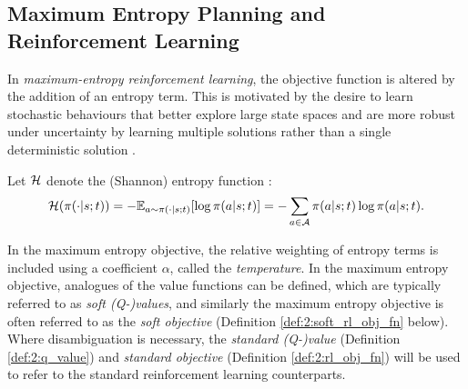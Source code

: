 \subsection[Maximum Entropy Planning and Reinforcement Learning]{Maximum Entropy Planning and Reinforcement Learning}
\label{sec:2-3-1-merl}

    In \textit{maximum-entropy reinforcement learning}, the objective function is altered by the addition of an entropy term. This is motivated by the desire to learn stochastic behaviours that better explore large state spaces and are more robust under uncertainty by learning multiple solutions rather than a single deterministic solution \cite{deep_energy_policies}. 
    
    Let $\mathcal{H}$ denote the (Shannon) entropy function \cite{entropy}:
    \begin{align}
        \mathcal{H}(\pi(\cdot|s;t)) = -\mathbb{E}_{a\sim\pi(\cdot|s;t)}[\log \pi(a|s;t)] = -\sum_{a\in\mathcal{A}} \pi(a|s;t) \log \pi(a|s;t). \label{eq:2:shannon_entropy_def}
    \end{align}

    In the maximum entropy objective, the relative weighting of entropy terms is included using a coefficient $\alpha$, called the \textit{temperature}. In the maximum entropy objective, analogues of the value functions can be defined, which are typically referred to as \textit{soft (Q-)values}, and similarly the maximum entropy objective is often referred to as the \textit{soft objective} (Definition \mbox{\ref{def:2:soft_rl_obj_fn}} below). Where disambiguation is necessary, the \textit{standard (Q-)value} (Definition \ref{def:2:q_value}) and \textit{standard objective} (Definition \ref{def:2:rl_obj_fn}) will be used to refer to the standard reinforcement learning counterparts. 

